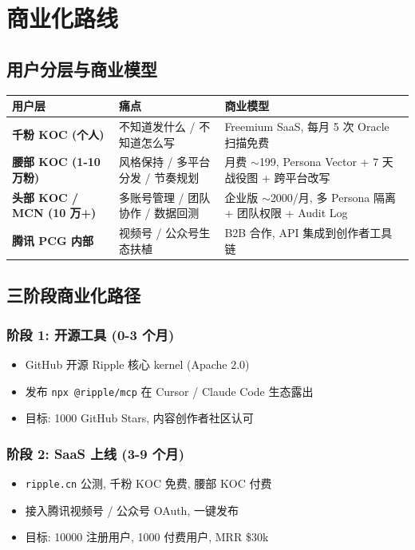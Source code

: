 \section{商业化路线}

\subsection{用户分层与商业模型}

\begin{tabularx}{\textwidth}{>{\bfseries}l X X}
    \toprule
    用户层 & 痛点 & 商业模型 \\
    \midrule
    千粉 KOC (个人) & 不知道发什么 / 不知道怎么写 & Freemium SaaS, 每月 5 次 Oracle 扫描免费 \\
    \midrule
    腰部 KOC (1-10 万粉) & 风格保持 / 多平台分发 / 节奏规划 & 月费 $\sim$199, Persona Vector + 7 天战役图 + 跨平台改写 \\
    \midrule
    头部 KOC / MCN (10 万+) & 多账号管理 / 团队协作 / 数据回测 & 企业版 $\sim$2000/月, 多 Persona 隔离 + 团队权限 + Audit Log \\
    \midrule
    腾讯 PCG 内部 & 视频号 / 公众号生态扶植 & B2B 合作, API 集成到创作者工具链 \\
    \bottomrule
\end{tabularx}

\subsection{三阶段商业化路径}

\subsubsection{阶段 1: 开源工具 (0-3 个月)}

\begin{itemize}
    \item GitHub 开源 Ripple 核心 kernel (Apache 2.0)
    \item 发布 \texttt{npx @ripple/mcp} 在 Cursor / Claude Code 生态露出
    \item 目标: 1000 GitHub Stars, 内容创作者社区认可
\end{itemize}

\subsubsection{阶段 2: SaaS 上线 (3-9 个月)}

\begin{itemize}
    \item \texttt{ripple.cn} 公测, 千粉 KOC 免费, 腰部 KOC 付费
    \item 接入腾讯视频号 / 公众号 OAuth, 一键发布
    \item 目标: 10000 注册用户, 1000 付费用户, MRR \$30k
\end{itemize}

